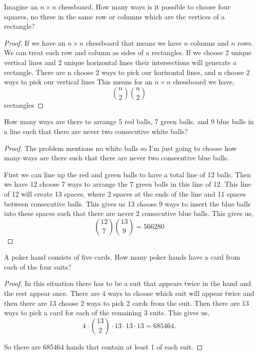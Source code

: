 \documentclass[11pt]{article}
\newenvironment{problem}[2][Problem\!]{\begin{trivlist}
\item[\hskip \labelsep {\bfseries #1}\hskip \labelsep {\bfseries #2}]}{\end{trivlist}}
\begin{document}
\newpage
\begin{tcolorbox}
    \begin{problem} {OC | 11/01 | 68}
        Imagine an $n \times n$ chessboard. How many ways is it possible to choose four squares, no three in the same row or columns which are the vertices of a rectangle?
    \end{problem}
\end{tcolorbox}
\begin{proof}
    If we have an $n\times n$ chessboard that means we have $n$ columns and $n$ rows. We can treat each row and column as sides of a rectangles. If we choose 2 unique vertical lines and 2 unique horizontal lines their intersections will generate a rectangle. There are n choose 2 ways to pick our horizontal lines, and n choose 2 ways to pick our vertical lines This means for an $n \times n$ chessboard we have, 
    \[\binom{n}{2}\binom{n}{2}\]
    rectangles

\end{proof}
\begin{tcolorbox}
    \begin{problem} {OC | 11/01 | 72.}
        How many ways are there to arrange 5 red balls, 7 green balls, and 9 blue balls in a line such that there are never two consecutive white balls?
    \end{problem}
\end{tcolorbox}

\begin{proof}
    The problem mentions no white balls so I'm just going to choose how many ways are there such that there are never two consecutive blue balls.

    First we can line up the red and green balls to have a total line of 12 balls. Then we have 12 choose 7 ways to arrange the 7 green balls in this line of 12. This line of 12 will create 13 spaces, where 2 spaces at the ends of the line and 11 spaces between consecutive balls. This gives us 13 choose 9 ways to insert the blue balls into these spaces such that there are never 2 consecutive blue balls. This gives us,
    \[\binom{12}{7}\binom{13}{9} = 566280\]
\end{proof}

\begin{tcolorbox}
    \begin{problem} {OC | 11/03 | 77.}
        A poker hand consists of five cards. How many poker hands have a card from each of the four suits?
    \end{problem}
\end{tcolorbox}
\begin{proof}
    In this situation there has to be a suit that appears twice in the hand and the rest appear once. There are 4 ways to choose which suit will appear twice and then there are 13 choose 2 ways to pick 2 cards from the suit. Then there are 13 ways to pick a card for each of the remaining 3 suits. This gives us,
    \[4 \cdot \binom{13}{2} \cdot 13 \cdot 13 \cdot 13 = 685464. \]

    So there are 685464 hands that contain at least 1 of each suit.
\end{proof}
\end{document}
